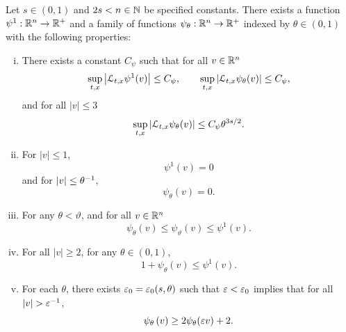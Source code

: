 \begin{lemma} \label{thm:psi_properties}
Let $s \in (0,1)$ and $2s < n \in \mathbb{N}$ be specified constants.  There exists a function $\psi^1:\mathbb{R}^n \to \mathbb{R}^+$ and a family of functions $\psi_\theta:\mathbb{R}^n \to \mathbb{R}^+$ indexed by $\theta \in (0,1)$ with the following properties:

\begin{enumerate}[(i)]
\item\label{L_of_psi} There exists a constant $C_\psi$ such that for all $v \in \mathbb{R}^n$
\[ \sup_{t,x} \left\lvert \mathcal{L}_{t,x}\psi^1(v) \right\rvert \leq C_\psi, \qquad \sup_{t,x} \left\lvert \mathcal{L}_{t,x}\psi_\theta(v) \right\rvert \leq C_\psi, \]
and for all $|v| \leq 3$
\[ \sup_{t,x} \left\lvert \mathcal{L}_{t,x}\psi_\theta(v) \right\rvert \leq C_\psi \theta^{3s/2}. \]

\item\label{psi_vanish_on_balls} For $|v| \leq 1$, 
\[ \psi^1(v)=0 \]
 and for $|v| \leq \theta^{-1}$, 
 \[ \psi_\theta(v)=0. \]

\item\label{psi_increasing} For any $\theta < \vartheta$, and for all $v \in \mathbb{R}^n$
\[ \psi_\theta(v) \leq \psi_\vartheta(v) \leq \psi^1(v). \]

\item\label{psi_geq_one_plus_psi} For all $|v| \geq 2$, for any $\theta \in (0,1)$,
\[ 1 + \psi_\theta(v) \leq \psi^1(v). \]

\item\label{psi_scaled_inequality} For each $\theta$, there exists $\varepsilon_0 = \varepsilon_0(s,\theta)$ such that $\varepsilon < \varepsilon_0$ implies that for all $|v| > \varepsilon^{-1}$,
\[ \psi_\theta\left( v \right) \geq 2\psi_\theta(\varepsilon v) + 2. \] 
\end{enumerate}
\end{lemma}

